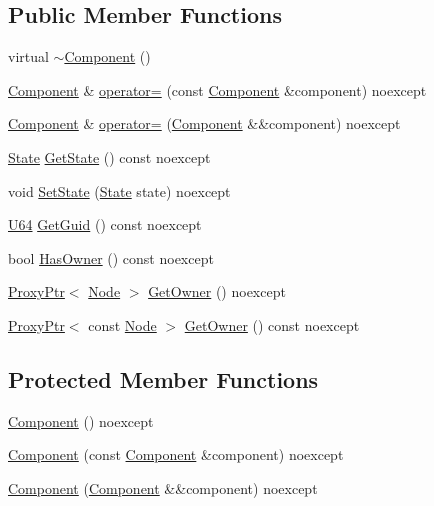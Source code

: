 \subsection*{Public Member Functions}
\begin{DoxyCompactItemize}
\item 
virtual \mbox{\hyperlink{classmage_1_1_component_a2326c6df733b0cabf3086ad4187ba607}{$\sim$\+Component}} ()
\item 
\mbox{\hyperlink{classmage_1_1_component}{Component}} \& \mbox{\hyperlink{classmage_1_1_component_a36f7fbb5f82fc7979d4e7d08389815ae}{operator=}} (const \mbox{\hyperlink{classmage_1_1_component}{Component}} \&component) noexcept
\item 
\mbox{\hyperlink{classmage_1_1_component}{Component}} \& \mbox{\hyperlink{classmage_1_1_component_ad45dae559785efbc090c0f83c1e08cd1}{operator=}} (\mbox{\hyperlink{classmage_1_1_component}{Component}} \&\&component) noexcept
\item 
\mbox{\hyperlink{namespacemage_ae47d13d8477ee94893b9a3947d28eebc}{State}} \mbox{\hyperlink{classmage_1_1_component_a56f63648ba479decbba4a6fbaa544b4d}{Get\+State}} () const noexcept
\item 
void \mbox{\hyperlink{classmage_1_1_component_a95a74e2df3f326c4e92ac6dea7ed97be}{Set\+State}} (\mbox{\hyperlink{namespacemage_ae47d13d8477ee94893b9a3947d28eebc}{State}} state) noexcept
\item 
\mbox{\hyperlink{namespacemage_a6672cf3c861707ce4a3235a3eb43941d}{U64}} \mbox{\hyperlink{classmage_1_1_component_a1af8d5d8d09e5de54851ebed22153571}{Get\+Guid}} () const noexcept
\item 
bool \mbox{\hyperlink{classmage_1_1_component_a8e62e223bdacc3eebddc43f8ebc8c4d9}{Has\+Owner}} () const noexcept
\item 
\mbox{\hyperlink{classmage_1_1_proxy_ptr}{Proxy\+Ptr}}$<$ \mbox{\hyperlink{classmage_1_1_node}{Node}} $>$ \mbox{\hyperlink{classmage_1_1_component_af6261b2a7688dd5a078a917e1ec69e0b}{Get\+Owner}} () noexcept
\item 
\mbox{\hyperlink{classmage_1_1_proxy_ptr}{Proxy\+Ptr}}$<$ const \mbox{\hyperlink{classmage_1_1_node}{Node}} $>$ \mbox{\hyperlink{classmage_1_1_component_a97f402d0f75eff5a893abd2821a5335d}{Get\+Owner}} () const noexcept
\end{DoxyCompactItemize}
\subsection*{Protected Member Functions}
\begin{DoxyCompactItemize}
\item 
\mbox{\hyperlink{classmage_1_1_component_aef66a6573c094143bf95d3a81df1098e}{Component}} () noexcept
\item 
\mbox{\hyperlink{classmage_1_1_component_abcd9e6ba7f9691f51d1802d5cf8a365a}{Component}} (const \mbox{\hyperlink{classmage_1_1_component}{Component}} \&component) noexcept
\item 
\mbox{\hyperlink{classmage_1_1_component_a3abb21d27d4e89513787396c27b0ff6d}{Component}} (\mbox{\hyperlink{classmage_1_1_component}{Component}} \&\&component) noexcept
\end{DoxyCompactItemize}
